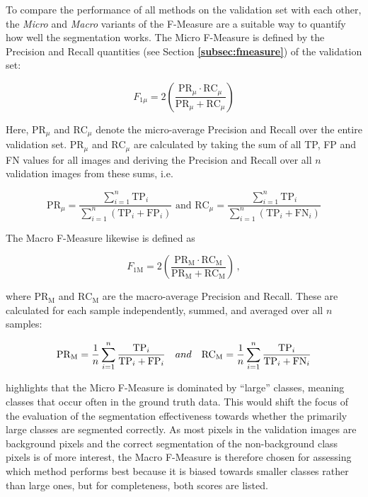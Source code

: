 \noindent To compare the performance of all methods on the validation set with each other, the \textit{Micro} and \textit{Macro} variants of the F-Measure \cite{micromacro} are a suitable way to quantify how well the segmentation works. The Micro F-Measure is defined by the Precision and Recall quantities (see Section \textbf{\ref{subsec:fmeasure}}) of the validation set:

\[ F_{1\mu} = 2 \left ( \frac{\text{PR}_\mu \cdot \text{RC}_\mu}{\text{PR}_\mu + \text{RC}_\mu} \right ) \]

\noindent Here, $\text{PR}_\mu$ and $\text{RC}_\mu$ denote the micro-average Precision and Recall over the entire validation set. $\text{PR}_\mu$ and $\text{RC}_\mu$ are calculated by taking the sum of all TP, FP and FN values for all images and deriving the Precision and Recall over all $n$ validation images from these sums, i.e.

\[ \text{PR}_\mu = \frac{\sum_{i=1}^{n}\text{TP}_i}{\sum_{i=1}^{n} (\text{TP}_i + \text{FP}_i)} \text{ and }  \text{RC}_\mu = \frac{\sum_{i=1}^{n} \text{TP}_i}{\sum_{i=1}^{n} (\text{TP}_i + \text{FN}_i)} \]

\noindent The Macro F-Measure likewise is defined as

\[ F_{\text{1M}} = 2 \left ( \frac{\text{PR}_\text{M} \cdot \text{RC}_\text{M}}{\text{PR}_\text{M} + \text{RC}_\text{M}} \right ) \,,\]

\noindent where $\text{PR}_\text{M}$ and $\text{RC}_\text{M}$ are the macro-average Precision and Recall. These are calculated for each sample independently, summed, and averaged over all $n$ samples:

\[ \text{PR}_\text{M} = \frac{1}{n} \sum_{i=1}^{n} \frac{\text{TP}_i}{\text{TP}_i + \text{FP}_i} \text \quad { and } \quad \text{RC}_\text{M} = \frac{1}{n} \sum_{i=1}^{n} \frac{\text{TP}_i}{\text{TP}_i + \text{FN}_i} \] 

\noindent \cite[pp. 317-318]{information_retrieval} highlights that the Micro F-Measure is dominated by ``large'' classes, meaning classes that occur often in the ground truth data. This would shift the focus of the evaluation of the segmentation effectiveness towards whether the primarily large classes are segmented correctly. As most pixels in the validation images are background pixels and the correct segmentation of the non-background class pixels is of more interest, the Macro F-Measure is therefore chosen for assessing which method performs best because it is biased towards smaller classes rather than large ones, but for completeness, both scores are listed.\\


